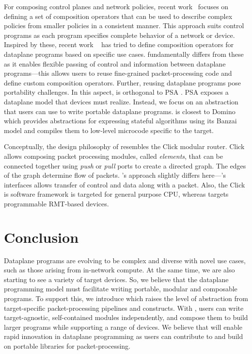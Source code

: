 \documentclass[letterpaper,twocolumn,10pt]{article}
\begin{document}
For composing control planes and network policies, recent
work~\cite{180291,Anderson:2014:NSF:2535838.2535862} focuses on
defining a set of composition operators that can be used to describe
complex policies from smaller policies in a consistent manner. This approach
suits control programs as each program specifies complete behavior of
a network or device. Inspired by these, recent work
~\cite{Hancock:2016:HUP:2999572.2999607,8038396,Zheng:2018:PLV:3281411.3281436}
has tried to define composition operators for dataplane programs based on
specific use cases. \ulang fundamentally differs from these as it
enables flexible passing of control and information between dataplane programs---this
allows users to reuse fine-grained packet-processing code and define
custom composition operators. Further, reusing dataplane programs pose
portability challenges. In this aspect, \ulang is orthogonal to PSA
\cite{psa}. PSA exposes a dataplane model that devices must realize.
Instead, we focus on an abstraction that users can use to write
portable dataplane programs. \ucomp is closest to
Domino~\cite{Sivaraman:2016:PTH:2934872.2934900} which provides
abstractions for expressing stateful algorithms using its Banzai model
and compiles them to low-level microcode specific to the target.

Conceptually, the design philosophy of \uarch resembles the Click
modular router\cite{Kohler:2000:CMR:354871.354874}. Click allows
composing packet processing modules, called \emph{elements}, that can
be connected together using \emph{push} or \emph{pull} ports to create
a directed graph. The edges of the graph determine flow of packets.
\ulang's approach slightly differs here---\uarch's interfaces allows
transfer of control and data along with a packet. Also, the Click is
software framework is targeted for general purpose CPU, whereas \ulang
targets programmable RMT-based devices.


\section{Conclusion}
Dataplane programs are evolving to be complex and diverse with novel
use cases, such as those arising from in-network compute. At the same
time, we are also starting to see a variety of target devices. So, we
believe that the dataplane programming model must facilitate writing
portable, modular and composable programs. To support this, we
introduce \ulang which raises the level of abstraction from
target-specific packet-processing pipelines and constructs. With
\ulang, users can write target-agnostic, self-contained modules
independently, and compose them to build larger programs while
supporting a range of devices. We believe that \ulang will enable
rapid innovation in dataplane programming as users can contribute to
and build on portable libraries for packet-processing.
\end{document}
